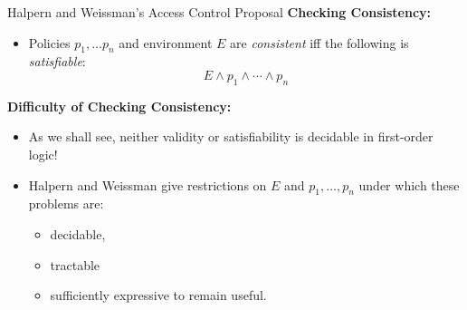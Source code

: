 \begin{wideslide}[bm=,toc=]{Halpern and Weissman's Access Control Proposal}
\textbf{Checking Consistency:}
\begin{itemize}
\item Policies $p_1,\dots p_n$ and environment $E$ are {\em consistent\/} iff
the following is {\em satisfiable\/}:
\begin{displaymath}
E\wedge p_1 \wedge \cdots \wedge p_n 
\end{displaymath}
\end{itemize}
\pause
\textbf{Difficulty of Checking Consistency:}
\begin{itemize}
\item<3-> As we shall see, neither validity or satisfiability is decidable in first-order logic!
\item<4-> Halpern and Weissman give restrictions on $E$ and $p_1,\ldots ,p_n$ under which
these problems are:
\begin{itemize}
\item<5->decidable,
\item<5->tractable
\item<5->sufficiently expressive to remain useful. 
\end{itemize}
\end{itemize}
\end{wideslide}

